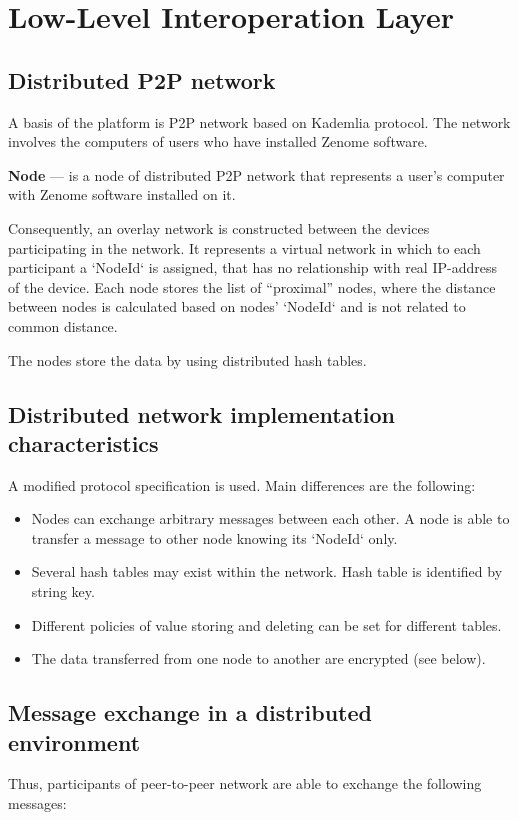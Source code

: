 \section{Low-Level Interoperation Layer}

\subsection{Distributed P2P network}
A basis of the platform is P2P network based on Kademlia protocol. The network involves the computers of users who have installed Zenome software.

\textbf{Node} --- is a node of distributed P2P network that represents a user's computer with Zenome software installed on it.

\begin{note}
 Consequently, an overlay network is constructed between the devices participating in the network. It represents a virtual network in which to each participant a `NodeId` is assigned, that has no relationship with real IP-address of the device. Each node stores the list of “proximal” nodes, where the distance between nodes is calculated based on nodes’ `NodeId` and is not related to common distance.
\end{note}

The nodes store the data by using distributed hash tables.


\subsection{Distributed network implementation characteristics}

A modified protocol specification is used. Main differences are the following:
\begin{itemize}
\item Nodes can exchange arbitrary messages between each other. A node is able to transfer a message to other node knowing its `NodeId` only.
\item Several hash tables may exist within the network. Hash table is identified by string key.
\item Different policies of value storing and deleting can be set for different tables.
\item The data transferred from one node to another are encrypted (see below).
\end{itemize}

\subsection{Message exchange in a distributed environment}
Thus, participants of peer-to-peer network are able to exchange the following messages:

